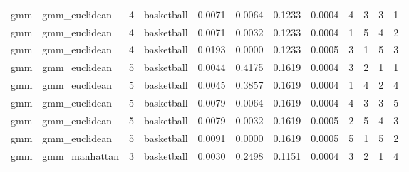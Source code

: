 {\begin{longtable}{| p{1cm} | p{1.8cm} | p{0.7cm} | p{0.9cm} | p{0.5cm} | p{0.65cm} | p{0.5cm} | p{0.5cm} | p{0.55cm} | p{0.55cm} | p{0.6cm} | p{0.5cm} |}
\scriptsize     gmm   & \scriptsize   gmm\_euclidean & \scriptsize    4     & \scriptsize basketball & \scriptsize    0.0071  &  \scriptsize 0.0064 &  \scriptsize 0.1233 & \scriptsize    0.0004 &   \scriptsize    4 &  \scriptsize    3 &  \scriptsize    3 &  \scriptsize    1 \\
\scriptsize     gmm   & \scriptsize   gmm\_euclidean & \scriptsize    4     & \scriptsize basketball & \scriptsize    0.0071   & \scriptsize 0.0032 &  \scriptsize 0.1233 & \scriptsize    0.0004 &   \scriptsize    1 &  \scriptsize    5  & \scriptsize    4  & \scriptsize    2 \\
\scriptsize     gmm   & \scriptsize   gmm\_euclidean & \scriptsize    4     & \scriptsize basketball & \scriptsize    0.0193   & \scriptsize 0.0000 &  \scriptsize 0.1233 & \scriptsize    0.0005 &   \scriptsize    3 &  \scriptsize    1 &  \scriptsize    5 &  \scriptsize    3 \\
\cline{3-12}
\scriptsize     gmm   & \scriptsize   gmm\_euclidean & \scriptsize    5     & \scriptsize basketball & \scriptsize    0.0044   & \scriptsize 0.4175 &  \scriptsize 0.1619 & \scriptsize    0.0004 &   \scriptsize    3 &  \scriptsize    2  & \scriptsize    1  & \scriptsize    1 \\
\scriptsize     gmm   & \scriptsize    gmm\_euclidean & \scriptsize    5    & \scriptsize basketball & \scriptsize    0.0045  &  \scriptsize 0.3857 & \scriptsize 0.1619 & \scriptsize    0.0004 & \scriptsize   1  & \scriptsize    4  & \scriptsize    2  & \scriptsize    4 \\
\scriptsize     gmm   & \scriptsize    gmm\_euclidean & \scriptsize    5    & \scriptsize basketball & \scriptsize    0.0079  &  \scriptsize 0.0064 & \scriptsize 0.1619 & \scriptsize    0.0004 & \scriptsize   4  & \scriptsize    3  & \scriptsize    3  & \scriptsize    5 \\
\scriptsize     gmm   & \scriptsize    gmm\_euclidean & \scriptsize    5    & \scriptsize basketball & \scriptsize    0.0079  &  \scriptsize 0.0032 & \scriptsize 0.1619 & \scriptsize    0.0005 & \scriptsize   2  & \scriptsize    5  & \scriptsize    4  & \scriptsize    3 \\
\scriptsize     gmm   & \scriptsize    gmm\_euclidean & \scriptsize    5    & \scriptsize basketball & \scriptsize    0.0091  &  \scriptsize 0.0000 & \scriptsize 0.1619 & \scriptsize    0.0005 & \scriptsize   5  & \scriptsize    1  & \scriptsize    5  & \scriptsize    2 \\
\cline{2-12}
\scriptsize     gmm   & \scriptsize    gmm\_manhattan & \scriptsize    3    & \scriptsize basketball & \scriptsize    0.0030  &  \scriptsize 0.2498 & \scriptsize 0.1151 & \scriptsize    0.0004 & \scriptsize   3  & \scriptsize    2  & \scriptsize    1  & \scriptsize    4 \\

\end{longtable}}
